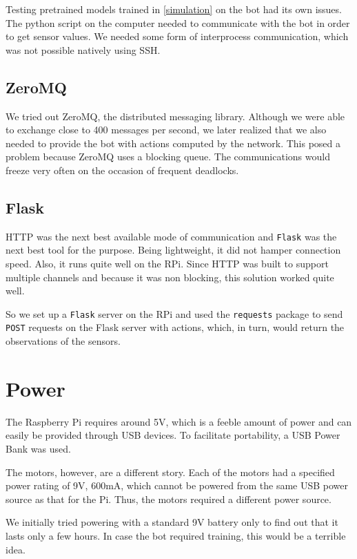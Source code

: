 \documentclass[12pt]{extreport}
\begin{document}
Testing pretrained models trained in \autoref{simulation} on the bot had its own issues. The python script on the computer needed to communicate with the bot in order to get sensor values. We needed some form of interprocess communication, which was not possible natively using SSH.

\subsection{ZeroMQ}
We tried out ZeroMQ, the distributed messaging library. Although we were able to exchange close to 400 messages per second, we later realized that we also needed to provide the bot with actions computed by the network. This posed a problem because ZeroMQ uses a blocking queue. The communications would freeze very often on the occasion of frequent deadlocks.

\subsection{Flask}
HTTP was the next best available mode of communication and \texttt{Flask} was the next best tool for the purpose. Being lightweight, it did not hamper connection speed. Also, it runs quite well on the RPi. Since HTTP was built to support multiple channels and because it was non blocking, this solution worked quite well.

So we set up a \texttt{Flask} server on the RPi and used the \texttt{requests} package to send \texttt{POST} requests on the Flask server with actions, which, in turn, would return the observations of the sensors.

\section{Power}

The Raspberry Pi requires around 5V, which is a feeble amount of power and can easily be provided through USB devices. To facilitate portability, a USB Power Bank was used.

The motors, however, are a different story. Each of the motors had a specified power rating of 9V, 600mA, which cannot be powered from the same USB power source as that for the Pi. Thus, the motors required a different power source.

We initially tried powering with a standard 9V battery only to find out that it lasts only a few hours. In case the bot required training, this would be a terrible idea.
\end{document}
